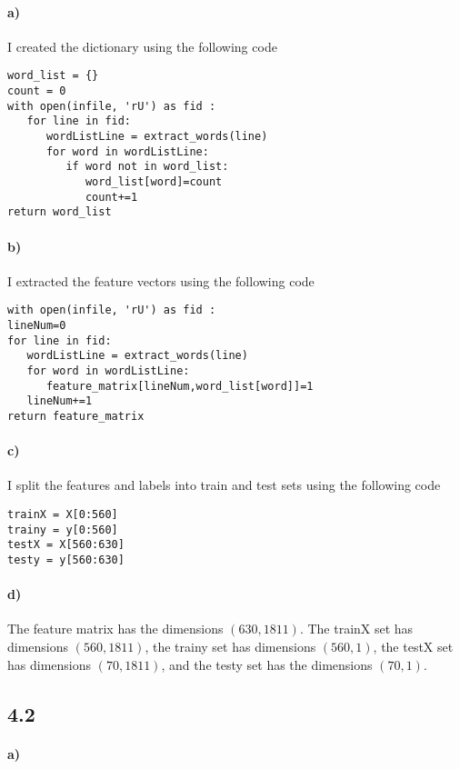 \documentclass[12pt]{article}
\begin{document}
\paragraph{a)}

I created the dictionary using the following code
\begin{verbatim}
word_list = {}
count = 0
with open(infile, 'rU') as fid :
   for line in fid:
      wordListLine = extract_words(line)
      for word in wordListLine:
         if word not in word_list:
            word_list[word]=count
            count+=1
return word_list
\end{verbatim}

\paragraph{b)}

I extracted the feature vectors using the following code
\begin{verbatim}
with open(infile, 'rU') as fid :
lineNum=0
for line in fid:
   wordListLine = extract_words(line)
   for word in wordListLine:
      feature_matrix[lineNum,word_list[word]]=1
   lineNum+=1
return feature_matrix
\end{verbatim}

\paragraph{c)}

I split the features and labels into train and test sets using the following code
\begin{verbatim}
trainX = X[0:560]
trainy = y[0:560]
testX = X[560:630]
testy = y[560:630]
\end{verbatim}

\paragraph{d)}

The feature matrix has the dimensions \((630,1811)\). The trainX set has dimensions \((560,1811)\), the trainy set has
dimensions \((560,1)\), the testX set has dimensions \((70,1811)\), and the testy set has the dimensions \((70,1)\).

\subsection*{4.2}

\paragraph{a)}
\end{document}
